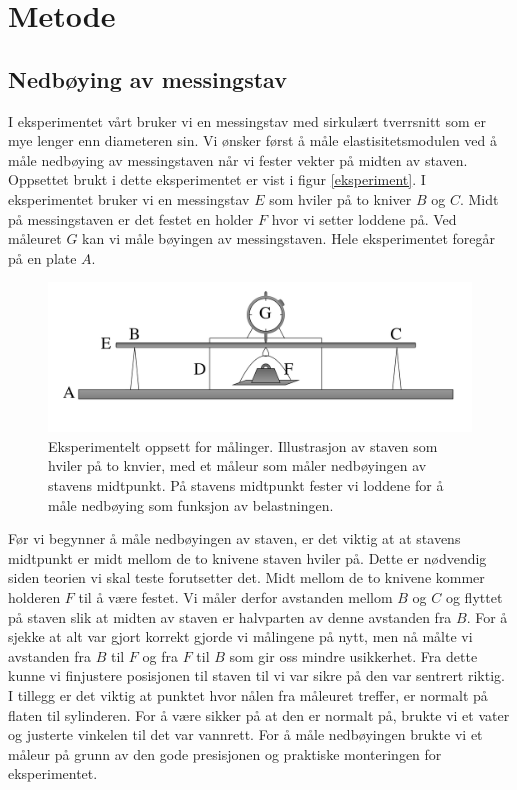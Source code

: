 \documentclass[%
 reprint,
 amsmath,amssymb,
 aps,
 norsk,
 booktabs
]{revtex4-1}
\begin{document}
\section{Metode}
\subsection{Nedbøying av messingstav}
I eksperimentet vårt bruker vi en messingstav med sirkulært tverrsnitt som er mye lenger enn diameteren sin. Vi ønsker først å måle elastisitetsmodulen ved å måle nedbøying av messingstaven når vi fester vekter på midten av staven. Oppsettet brukt i dette eksperimentet er vist i figur \vref{eksperiment}. I eksperimentet bruker vi en messingstav $E$ som hviler på to kniver $B$ og $C$. Midt på messingstaven er det festet en holder $F$ hvor vi setter loddene på. Ved måleuret $G$ kan vi måle bøyingen av messingstaven. Hele eksperimentet foregår på en plate $A$.\\
\begin{figure}
  \centering
  \includegraphics[scale=0.17]{oppsett.png}
  \caption{Eksperimentelt oppsett for målinger. Illustrasjon av staven som hviler på to knvier, med et måleur som måler nedbøyingen av stavens midtpunkt. På stavens midtpunkt fester vi loddene for å måle nedbøying som funksjon av belastningen.}
  \label{eksperiment}
\end{figure}
Før vi begynner å måle nedbøyingen av staven, er det viktig at at stavens midtpunkt er midt mellom de to knivene staven hviler på. Dette er nødvendig siden teorien vi skal teste forutsetter det. Midt mellom de to knivene kommer holderen $F$ til å være festet. Vi måler derfor avstanden mellom $B$ og $C$ og flyttet på staven slik at midten av staven er halvparten av denne avstanden fra $B$. For å sjekke at alt var gjort korrekt gjorde vi målingene på nytt, men nå målte vi avstanden fra $B$ til $F$ og fra $F$ til $B$ som gir oss mindre usikkerhet. Fra dette kunne vi finjustere posisjonen til staven til vi var sikre på den var sentrert riktig. I tillegg er det viktig at punktet hvor nålen fra måleuret treffer, er normalt på flaten til sylinderen. For å være sikker på at den er normalt på, brukte vi et vater og justerte vinkelen til det var vannrett. For å måle nedbøyingen brukte vi et måleur på grunn av den gode presisjonen og praktiske monteringen for eksperimentet.\\
\end{document}
